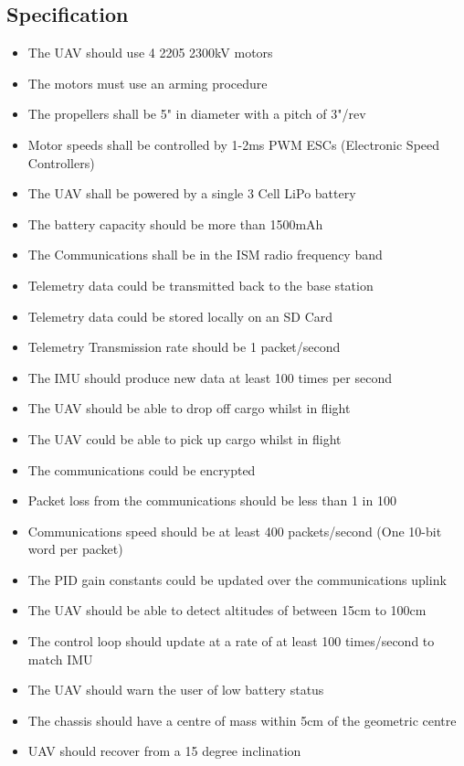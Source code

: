 \documentclass[a4paper,11pt]{article}
\begin{document}
\subsection{Specification}
\begin{itemize}
\item The UAV should use 4 2205 2300kV motors
\item The motors must use an arming procedure
\item The propellers shall be 5" in diameter with a pitch of 3"/rev
\item Motor speeds shall be controlled by 1-2ms PWM ESCs (Electronic Speed Controllers)
\item The UAV shall be powered by a single 3 Cell LiPo battery
\item The battery capacity should be more than 1500mAh
\item The Communications shall be in the ISM radio frequency band
\item Telemetry data could be transmitted back to the base station
\item Telemetry data could be stored locally on an SD Card 
\item Telemetry Transmission rate should be 1 packet/second
\item The IMU should produce new data at least 100 times per second
\item The UAV should be able to drop off cargo whilst in flight
\item The UAV could be able to pick up cargo whilst in flight
\item The communications could be encrypted
\item Packet loss from the communications should be less than 1 in 100
\item Communications speed should be at least 400 packets/second (One 10-bit word per packet)
\item The PID gain constants could be updated over the communications uplink
\item The UAV should be able to detect altitudes of between 15cm to 100cm
\item The control loop should update at a rate of at least 100 times/second to match IMU 
\item The UAV should warn the user of low battery status
\item The chassis should have a centre of mass within 5cm of the geometric centre
\item UAV should recover from a 15 degree inclination
\end{itemize}
\end{document}
